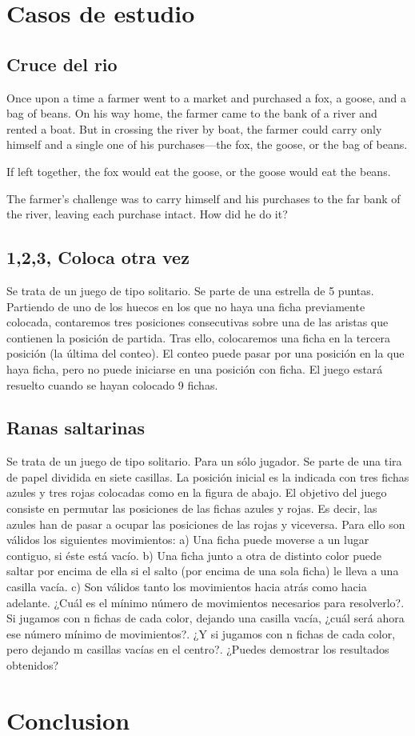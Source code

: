 \chapter{Casos de estudio}

\section{Cruce del rio}

Once upon a time a farmer went to a market and purchased a fox, a goose, and a bag of beans. On his way home, the farmer came to the bank of a river and rented a boat. But in crossing the river by boat, the farmer could carry only himself and a single one of his purchases—the fox, the goose, or the bag of beans.

If left together, the fox would eat the goose, or the goose would eat the beans.

The farmer's challenge was to carry himself and his purchases to the far bank of the river, leaving each purchase intact. How did he do it? \cite{Hadley:12}

\section{1,2,3, Coloca otra vez}

Se trata de un juego de tipo solitario.
Se parte de una estrella de 5 puntas.
Partiendo de uno de los huecos en los que no haya una ficha previamente colocada, contaremos tres posiciones consecutivas sobre una de las aristas que contienen la posición de partida. Tras ello, colocaremos una ficha en la tercera posición (la última del conteo).
El conteo puede pasar por una posición en la que haya ficha, pero no puede iniciarse en una posición con ficha.
El juego estará resuelto cuando se hayan colocado 9 fichas. \cite{Juegos:11}

\section{Ranas saltarinas}

Se trata de un juego de tipo solitario. Para un sólo jugador.
Se parte de una tira de papel dividida en siete casillas.
La posición inicial es la indicada con tres fichas azules y tres rojas colocadas como en la figura de abajo.
El objetivo del juego consiste en permutar las posiciones de las fichas azules y rojas. Es decir, las azules han de pasar a ocupar las posiciones de las rojas y viceversa. Para ello son válidos los siguientes movimientos:
a) Una ficha puede moverse a un lugar contiguo, si éste está vacío.
b) Una ficha junto a otra de distinto color puede saltar por encima de ella si el salto (por encima de una sola ficha) le lleva a una casilla vacía.
c) Son válidos tanto los movimientos hacia atrás como hacia adelante.
¿Cuál es el mínimo número de movimientos necesarios para resolverlo?.
Si jugamos con n fichas de cada color, dejando una casilla vacía, ¿cuál será ahora ese número mínimo de movimientos?.
¿Y si jugamos con n fichas de cada color, pero dejando m casillas vacías en el centro?.
¿Puedes demostrar los resultados obtenidos? \cite{Juegos:11}

\chapter*{Conclusion}